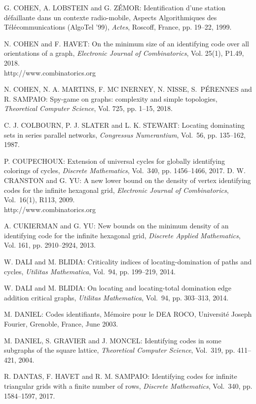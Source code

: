 \begin{thebibliography}{999}
G. COHEN, A. LOBSTEIN and G. Z\'EMOR: Identification d'une station d\'efaillante dans un contexte radio-mobile, Aspects Algorithmiques des T\'el\'ecommunications (AlgoTel '99), {\it Actes}, Roscoff, France, pp. 19--22, 1999.

N. COHEN and F. HAVET: On the minimum size of an identifying code over all orientations of a graph, {\it Electronic Journal of Combinatorics}, Vol. 25(1), P1.49, 2018.\\
http://www.combinatorics.org

N. COHEN, N. A. MARTINS, F. MC INERNEY, N. NISSE, S.~P\'E\-RENNES and R. SAMPAIO: Spy-game on graphs: complexity and simple topologies, {\it Theoretical Computer Science}, Vol. 725, pp. 1--15, 2018. 

C. J. COLBOURN, P. J. SLATER and L. K. STEWART: Locating dominating sets in series parallel networks, {\it Congressus Numerantium}, Vol.~56, pp. 135--162, 1987.

P. COUPECHOUX: Extension of universal cycles for globally identifying colorings of cycles, {\it Discrete Mathematics}, Vol.~340, pp. 1456--1466, 2017.
D. W. CRANSTON and G. YU: A new lower bound on the density of vertex identifying codes for the infinite hexagonal grid, {\it Electronic Journal of Combinatorics}, Vol.~16(1), R113, 2009.\\
http://www.combinatorics.org

A. CUKIERMAN and G. YU: New bounds on the minimum density of an identifying code for the infinite hexagonal grid, {\it Discrete Applied Mathematics}, Vol. 161, pp. 2910--2924, 2013.

W. DALI and M. BLIDIA: Criticality indices of locating-domination of paths and cycles, {\it Utilitas Mathematica}, Vol.~94, pp. 199--219, 2014.

W. DALI and M. BLIDIA: On locating and locating-total domination edge addition critical graphs, {\it Utilitas Mathematica}, Vol.~94, pp. 303--313, 2014.

M. DANIEL: Codes identifiants, M\'emoire pour le DEA ROCO, Universit\'e Joseph Fourier, Grenoble, France, June 2003.

M. DANIEL, S. GRAVIER and J. MONCEL: Identifying codes in some subgraphs of the square lattice, {\it Theoretical Computer Science}, Vol.~319, pp. 411--421, 2004.

R. DANTAS, F. HAVET and R. M. SAMPAIO: Identifying codes for infinite triangular grids with a finite number of rows, {\it Discrete Mathematics}, Vol.~340, pp. 1584--1597, 2017.


\end{thebibliography}
